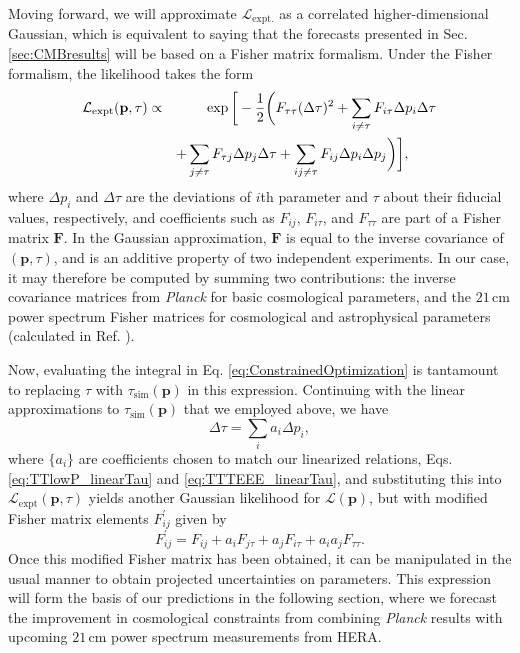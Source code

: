 \documentclass[twocolumn,aps,prd,nofootinbib,showpacs]{revtex4-1}
\begin{document}
Moving forward, we will approximate $\mathcal{L}_\textrm{expt.}$ as a correlated higher-dimensional Gaussian, which is equivalent to saying that the forecasts presented in Sec. \ref{sec:CMBresults} will be based on a Fisher matrix formalism. Under the Fisher formalism, the likelihood takes the form
\begin{eqnarray}
\mathcal{L}_\textrm{expt} ( \mathbf{p}, \tau) \propto &&\,\, \exp \bigg{[}-\frac{1}{2} \bigg{(}F_{\tau \tau} (\Delta \tau)^2  + \sum_{i \neq \tau} F_{i \tau} \Delta p_i \Delta \tau \nonumber \\
&& + \sum_{j \neq \tau} F_{\tau j} \Delta p_j \Delta \tau  + \sum_{ij \neq \tau}F_{ij} \Delta p_i \Delta p_j \bigg{ )}\bigg{]}, \qquad
\end{eqnarray}
where $\Delta p_i$ and $ \Delta \tau$ are the deviations of $i$th parameter and $\tau$ about their fiducial values, respectively, and coefficients such as $F_{ij}$, $F_{i\tau}$, and $F_{\tau \tau}$ are part of a Fisher matrix $\mathbf{F}$. In the Gaussian approximation, $\mathbf{F}$ is equal to the inverse covariance of $( \mathbf{p},  \tau)$, and is an additive property of two independent experiments. In our case, it may therefore be computed by summing two contributions: the inverse covariance matrices from \emph{Planck} for basic cosmological parameters, and the $21\,\textrm{cm}$ power spectrum Fisher matrices for cosmological and astrophysical parameters (calculated in Ref. \cite{Liu_in_prep}).

Now, evaluating the integral in Eq. \eqref{eq:ConstrainedOptimization} is tantamount to replacing $\tau$ with $\tau_\textrm{sim} (\mathbf{p})$ in this expression. Continuing with the linear approximations to $\tau_\textrm{sim} (\mathbf{p})$ that we employed above, we have
\begin{equation}
\Delta \tau = \sum_i a_i \Delta p_i,
\end{equation}
where $\{a_i \}$ are coefficients chosen to match our linearized relations, Eqs. \eqref{eq:TTlowP_linearTau} and \eqref{eq:TTTEEE_linearTau}, and substituting this into $\mathcal{L}_\textrm{expt} ( \mathbf{p}, \tau)$ yields another Gaussian likelihood for $\mathcal{L} (\mathbf{p})$, but with modified Fisher matrix elements $F^\prime_{ij}$ given by
\begin{equation}
\label{eq:newFisher}
F^\prime_{ij} = F_{ij} + a_i F_{j \tau} + a_j F_{i \tau} + a_i a_j F_{\tau \tau}.
\end{equation}
Once this modified Fisher matrix has been obtained, it can be manipulated in the usual manner to obtain projected uncertainties on parameters. This expression will form the basis of our predictions in the following section, where we forecast the improvement in cosmological constraints from combining \emph{Planck} results with upcoming $21\,\textrm{cm}$ power spectrum measurements from HERA.
\end{document}
